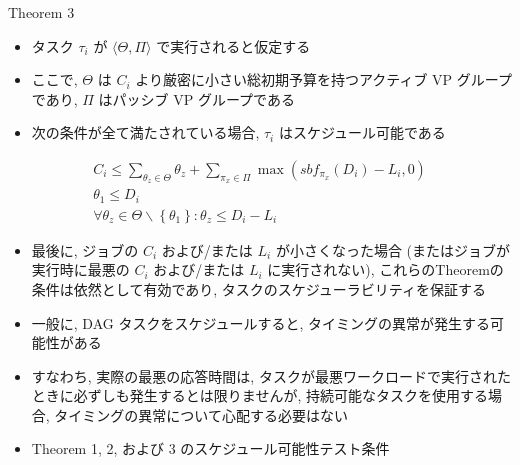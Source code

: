 \begin{frame}[label=theorem3]{Theorem 3}
    \begin{theorem}[]
        \begin{itemize}
            \item タスク $\tau_{i}$ が $\langle\Theta, \Pi\rangle$ で実行されると仮定する
            \item ここで, $\Theta$ は $C_{i}$ より厳密に小さい総初期予算を持つアクティブ VP グループであり, $\Pi$ はパッシブ VP グループである
            \item 次の条件が全て満たされている場合, $\tau_{i}$ はスケジュール可能である
        \end{itemize}
        \begin{equation*}
            \begin{gathered}
                C_{i} \leq \sum_{\theta_{z} \in \Theta} \theta_{z}+\sum_{\pi_{x} \in \Pi} \max \left(s b f_{\pi_{x}}\left(D_{i}\right)-L_{i}, 0\right) \\
                \theta_{1} \leq D_{i} \\
                \forall \theta_{z} \in \Theta \backslash\left\{\theta_{1}\right\}: \theta_{z} \leq D_{i}-L_{i}
            \end{gathered}
        \end{equation*}
    \end{theorem}
\end{frame}

\begin{frame}{}
    \begin{itemize}
        \item 最後に, ジョブの $C_{i}$ および/または $L_{i}$ が小さくなった場合 (またはジョブが実行時に最悪の $C_{i}$ および/または $L_{i}$ に実行されない), これらのTheoremの条件は依然として有効であり, タスクのスケジューラビリティを保証する
        \item 一般に, DAG タスクをスケジュールすると, タイミングの異常が発生する可能性がある
        \item すなわち, 実際の最悪の応答時間は, タスクが最悪ワークロードで実行されたときに必ずしも発生するとは限りませんが, 持続可能なタスクを使用する場合, タイミングの異常について心配する必要はない
        \item Theorem 1, 2, および 3 のスケジュール可能性テスト条件
    \end{itemize}
\end{frame}
